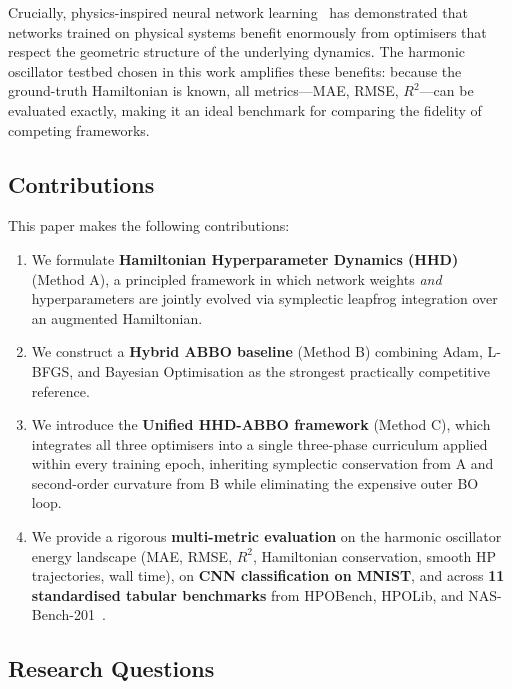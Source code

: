 \documentclass[12pt,a4paper]{article}
\begin{document}
Crucially, physics-inspired neural network learning~\cite{greydanus2019,zhang2025}
has demonstrated that networks trained on physical systems benefit
enormously from optimisers that respect the geometric structure of the
underlying dynamics.  The harmonic oscillator testbed chosen in this
work amplifies these benefits: because the ground-truth Hamiltonian is
known, all metrics—MAE, RMSE, $R^2$—can be evaluated exactly, making it
an ideal benchmark for comparing the fidelity of competing frameworks.

\subsection{Contributions}

This paper makes the following contributions:

\begin{enumerate}[leftmargin=*, label=\arabic*.]
\item We formulate \textbf{Hamiltonian Hyperparameter Dynamics (HHD)}
      (Method A), a principled framework in which network weights
      \emph{and} hyperparameters are jointly evolved via symplectic
      leapfrog integration over an augmented Hamiltonian.

\item We construct a \textbf{Hybrid ABBO baseline} (Method B) combining
      Adam, L-BFGS, and Bayesian Optimisation as the strongest
      practically competitive reference.

\item We introduce the \textbf{Unified HHD-ABBO framework}
      (Method C), which integrates all three optimisers into a
      single three-phase curriculum applied within every training
      epoch, inheriting symplectic conservation from A and
      second-order curvature from B while eliminating the expensive
      outer BO loop.

\item We provide a rigorous \textbf{multi-metric evaluation} on the
      harmonic oscillator energy landscape (MAE, RMSE, $R^2$,
      Hamiltonian conservation, smooth HP trajectories, wall time),
      on \textbf{CNN classification on MNIST}, and across
      \textbf{11 standardised tabular benchmarks} from HPOBench,
      HPOLib, and NAS-Bench-201~\cite{eggensperger2021,dong2020nasbench201}.
\end{enumerate}

\subsection{Research Questions}
\end{document}
